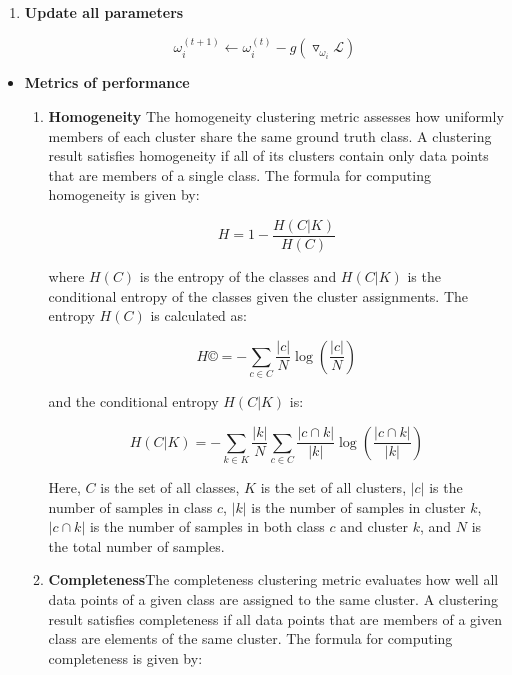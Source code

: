 \documentclass[a4paper,12pt]{article}
\begin{document}
\begin{itemize}
\begin{enumerate}
{\begin{enumerate}
				\item[]{\textbf{Update all parameters}
					
					\[\omega_i^{(t+1)} \leftarrow \omega_i^{(t)} - g\left(\triangledown_{\omega_i}\mathcal{L}\right) \]
				
				}  
			\end{enumerate}
			
		}
		\end{enumerate} 
	
	\end{itemize}
	
	
	
\newpage
\begin{itemize}
	\item[]{\textbf{Metrics of performance}}
	\begin{enumerate}
		\item[] {\textbf{Homogeneity} The homogeneity clustering metric assesses how uniformly members of each cluster share the same ground truth class. A clustering result satisfies homogeneity if all of its clusters contain only data points that are members of a single class. The formula for computing homogeneity is given by:
			
			\[ H = 1 - \frac{H(C|K)}{H(C)} \]
			
			where $H(C)$ is the entropy of the classes and $H(C|K)$ is the conditional entropy of the classes given the cluster assignments. The entropy $H(C)$ is calculated as:
			
			\[ H© = - \sum_{c \in C} \frac{|c|}{N} \log \left( \frac{|c|}{N} \right) \]
			
			and the conditional entropy $H(C|K)$ is:
			
			\[ H(C|K) = - \sum_{k \in K} \frac{|k|}{N} \sum_{c \in C} \frac{|c \cap k|}{|k|} \log \left( \frac{|c \cap k|}{|k|} \right) \]
			
			Here, $C$ is the set of all classes, $K$ is the set of all clusters, $|c|$ is the number of samples in class $c$, $|k|$ is the number of samples in cluster $k$, $|c \cap k|$ is the number of samples in both class $c$ and cluster $k$, and $N$ is the total number of samples.}
		
		\item[]{\textbf{Completeness}The completeness clustering metric evaluates how well all data points of a given class are assigned to the same cluster. A clustering result satisfies completeness if all data points that are members of a given class are elements of the same cluster. The formula for computing completeness is given by:
			
}
\end{enumerate}
\end{itemize}
\end{document}
